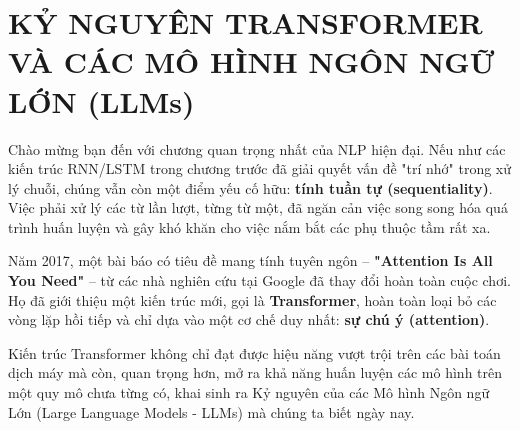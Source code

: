 \chapter{KỶ NGUYÊN TRANSFORMER VÀ CÁC MÔ HÌNH NGÔN NGỮ LỚN (LLMs)}
\label{chap:transformer_llms}

Chào mừng bạn đến với chương quan trọng nhất của NLP hiện đại. Nếu như các kiến trúc RNN/LSTM trong chương trước đã giải quyết vấn đề "trí nhớ" trong xử lý chuỗi, chúng vẫn còn một điểm yếu cố hữu: \textbf{tính tuần tự (sequentiality)}. Việc phải xử lý các từ lần lượt, từng từ một, đã ngăn cản việc song song hóa quá trình huấn luyện và gây khó khăn cho việc nắm bắt các phụ thuộc tầm rất xa.

Năm 2017, một bài báo có tiêu đề mang tính tuyên ngôn -- \textbf{"Attention Is All You Need"} -- từ các nhà nghiên cứu tại Google đã thay đổi hoàn toàn cuộc chơi. Họ đã giới thiệu một kiến trúc mới, gọi là \textbf{Transformer}, hoàn toàn loại bỏ các vòng lặp hồi tiếp và chỉ dựa vào một cơ chế duy nhất: \textbf{sự chú ý (attention)}.

Kiến trúc Transformer không chỉ đạt được hiệu năng vượt trội trên các bài toán dịch máy mà còn, quan trọng hơn, mở ra khả năng huấn luyện các mô hình trên một quy mô chưa từng có, khai sinh ra Kỷ nguyên của các Mô hình Ngôn ngữ Lớn (Large Language Models - LLMs) mà chúng ta biết ngày nay.